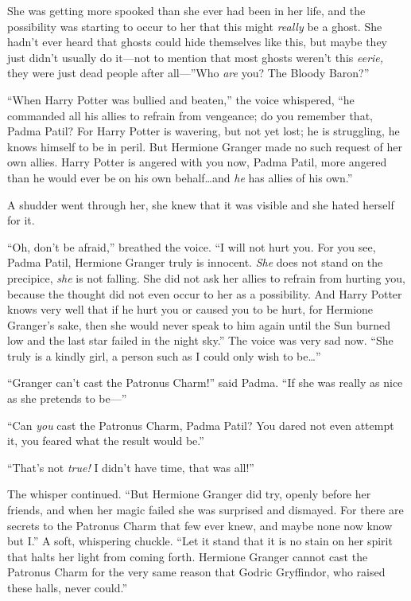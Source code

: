 She was getting more spooked than she ever had been in her life, and the possibility was starting to occur to her that this might \emph{really} be a ghost. She hadn’t ever heard that ghosts could hide themselves like this, but maybe they just didn’t usually do it—not to mention that most ghosts weren’t this \emph{eerie,} they were just dead people after all—”Who \emph{are} you? The Bloody Baron?”

“When Harry Potter was bullied and beaten,” the voice whispered, “he commanded all his allies to refrain from vengeance; do you remember that, Padma Patil? For Harry Potter is wavering, but not yet lost; he is struggling, he knows himself to be in peril. But Hermione Granger made no such request of her own allies. Harry Potter is angered with you now, Padma Patil, more angered than he would ever be on his own behalf…and \emph{he} has allies of his own.”

A shudder went through her, she knew that it was visible and she hated herself for it.

“Oh, don’t be afraid,” breathed the voice. “I will not hurt you. For you see, Padma Patil, Hermione Granger truly is innocent. \emph{She} does not stand on the precipice, \emph{she} is not falling. She did not ask her allies to refrain from hurting you, because the thought did not even occur to her as a possibility. And Harry Potter knows very well that if he hurt you or caused you to be hurt, for Hermione Granger’s sake, then she would never speak to him again until the Sun burned low and the last star failed in the night sky.” The voice was very sad now. “She truly is a kindly girl, a person such as I could only wish to be…”

“Granger can’t cast the Patronus Charm!” said Padma. “If she was really as nice as she pretends to be—”

“Can \emph{you} cast the Patronus Charm, Padma Patil? You dared not even attempt it, you feared what the result would be.”

“That’s not \emph{true!} I didn’t have time, that was all!”

The whisper continued. “But Hermione Granger did try, openly before her friends, and when her magic failed she was surprised and dismayed. For there are secrets to the Patronus Charm that few ever knew, and maybe none now know but I.” A soft, whispering chuckle. “Let it stand that it is no stain on her spirit that halts her light from coming forth. Hermione Granger cannot cast the Patronus Charm for the very same reason that Godric Gryffindor, who raised these halls, never could.”

